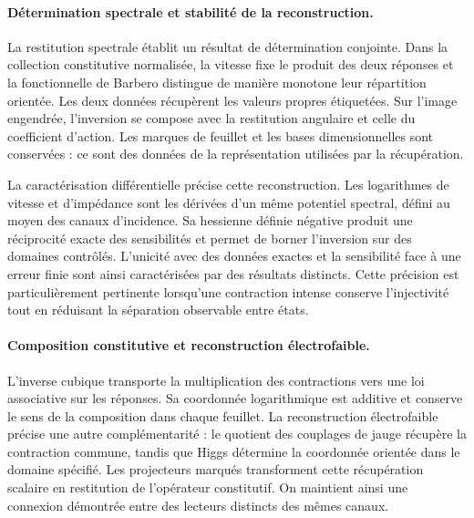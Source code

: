 \paragraph{Détermination spectrale et stabilité de la reconstruction.}
La restitution spectrale établit un résultat de détermination conjointe. Dans la collection
constitutive normalisée, la vitesse fixe le produit des deux
réponses et la fonctionnelle de Barbero distingue de manière monotone leur répartition
orientée. Les deux données récupèrent les valeurs propres étiquetées. Sur
l’image engendrée, l’inversion se compose avec la restitution angulaire et celle du
coefficient d’action. Les marques de feuillet et les bases dimensionnelles sont
conservées : ce sont des données de la représentation utilisées par la récupération.

La caractérisation différentielle précise cette reconstruction. Les logarithmes de vitesse et
d’impédance sont les dérivées d’un même potentiel spectral, défini
au moyen des canaux d’incidence. Sa hessienne définie négative produit
une réciprocité exacte des sensibilités et permet de borner l’inversion
sur des domaines contrôlés. L’unicité avec des données exactes et la sensibilité
face à une erreur finie sont ainsi caractérisées par des résultats distincts.
Cette précision est particulièrement pertinente lorsqu’une contraction
intense conserve l’injectivité tout en réduisant la séparation
observable entre états.

\paragraph{Composition constitutive et reconstruction électrofaible.}
L’inverse cubique transporte la multiplication des contractions vers une
loi associative sur les réponses. Sa coordonnée logarithmique est
additive et conserve le sens de la composition dans chaque feuillet. La
reconstruction électrofaible précise une autre complémentarité : le quotient
des couplages de jauge récupère la contraction commune, tandis que
Higgs détermine la coordonnée orientée dans le domaine spécifié.
Les projecteurs marqués transforment cette récupération scalaire en
restitution de l’opérateur constitutif. On maintient ainsi une connexion
démontrée entre des lecteurs distincts des mêmes canaux.


